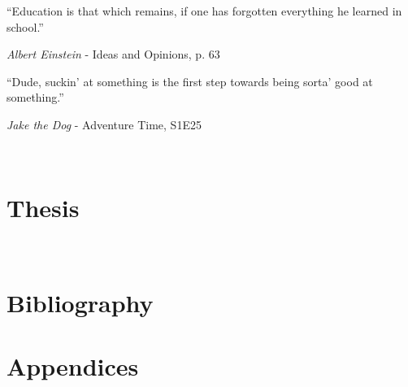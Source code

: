\renewcommand{\epigraphsize}{\large}
\renewcommand{\epigraphwidth}{10cm}
\vspace{3cm}
\epigraph{``Education is that which remains, if one has forgotten everything he learned in school.''}{\textit{Albert Einstein} - Ideas and Opinions, p. 63}
\vspace{2cm}
\epigraph{``Dude, suckin’ at something is the first step towards being sorta' good at something.''}{\textit{Jake the Dog} - Adventure Time, S1E25}

\newpage

\vspace{-1cm}
\setcounter{tocdepth}{3}
\tableofcontents
\newpage
\listoffigures
\newpage \ \newpage %

\makeatletter
\@openrightfalse
\makeatother
\part{Thesis}
\pagestyle{fancy}






\newpage \ \newpage %

\nocite{*}
\makeatletter
\@openrightfalse
\makeatother
\part{Bibliography}
\pagestyle{fancy}
\printbibliography[
    category=cited,
    heading=subbibliography,
    resetnumbers
]
\newpage
\printbibliography[
    notcategory=cited,
    heading=subbibliography,
    title={Not cited yet},
    resetnumbers
]

\makeatletter
\@openrightfalse
\makeatother
\pagestyle{empty}
\part{Appendices}
\appendix
{}

\newpage


